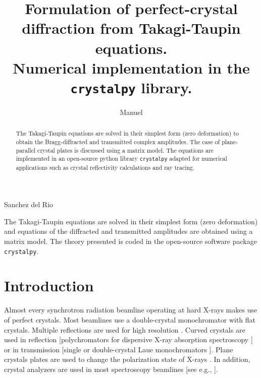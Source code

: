\documentclass{iucr}
\begin{document}

\title{Formulation of perfect-crystal diffraction  from Takagi-Taupin equations. \\ Numerical implementation in the \texttt{crystalpy} library.}


\author[a]{Manuel}{Sanchez del Rio}



\maketitle   %

\begin{synopsis}
The Takagi-Taupin equations are solved in their simplest form (zero deformation) and equations of the diffracted and transmitted amplitudes are obtained using a matrix model. The theory presented is coded in the open-source software package {\tt crystalpy}.
\end{synopsis}

\begin{abstract}

The Takagi-Taupin equations are solved in their simplest form (zero deformation) to obtain the Bragg-diffracted and transmitted complex amplitudes. The case of plane-parallel crystal plates is discussed using a matrix model. The equations are implemented in an open-source python library \texttt{crystalpy} adapted for numerical applications such as crystal reflectivity calculations and ray tracing.

\end{abstract}


%
\section{Introduction}
\label{sec:Intro}

Almost every synchrotron radiation beamline operating at hard X-rays makes use of perfect crystals.  
Most beamlines use a double-crystal monochromator with flat crystals. Multiple reflections are used for high resolution \cite{Ishikawa2005, shvyd2004x}. Curved crystals are used in reflection [polychromators for dispersive X-ray absorption spectroscopy \cite{Tolentino:ms0206}] or in transmission [single \cite{Suortti1993} or double-crystal Laue monochromators \cite{Ren1999}]. 
Plane crystals plates are used to change the polarization state of X-rays \cite{bouchenoire2003performance, Detlefs2012}.
In addition, crystal analyzers are used in most spectroscopy beamlines [see e.g., \cite{Rovezzi2017}].
\end{document}
